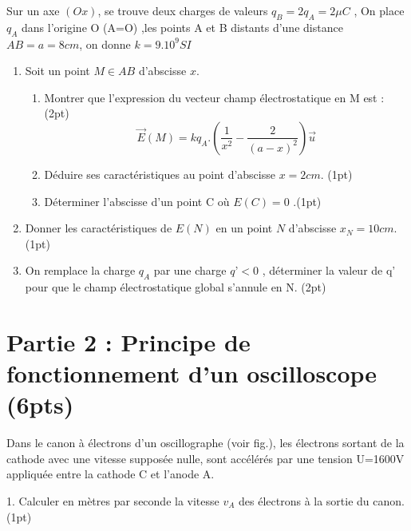 \documentclass[12pt]{article}
\begin{document}
Sur un axe $(Ox)$, se trouve deux charges de valeurs $q_B = 2q_A = 2\mu C$ , On place $q_A$ dans l'origine O (A=O) ,les points A et B
distants d’une distance $AB=a=8 cm$, on donne $k = 9.10^9SI$

\begin{enumerate}
    \item  Soit un point $M \in AB$ d’abscisse $x$.
      \begin{enumerate}
        \item Montrer que l’expression du vecteur champ électrostatique en M est :\dotfill(2pt) $$\vec{E}(M) = kq_A.(\frac{1}{x^2} - \frac{2}{(a-x)^2})\vec{u}$$
        \item Déduire ses caractéristiques au point d’abscisse $x=2 cm$. \dotfill(1pt)
        \item Déterminer l’abscisse d’un point C où $E(C)=0$ .\dotfill(1pt)
      \end{enumerate}
    \item Donner les caractéristiques de $E(N)$ en un point $N$ d’abscisse $x_N =10 cm$. \dotfill(1pt)
    \item On remplace la charge $q_A$ par une charge $q’<0$ , déterminer la valeur de q’ pour que le champ électrostatique global s’annule en N. \dotfill(2pt)
\end{enumerate}

 \section*{Partie 2 : Principe de fonctionnement d'un oscilloscope \dotfill(6pts)}
Dans le canon à électrons d’un oscillographe (voir fig.), les électrons sortant de la cathode avec une vitesse
supposée nulle, sont accélérés par une tension U=1600V appliquée entre la cathode C et l’anode A.

1. Calculer en mètres par seconde la vitesse $v_A$ des électrons à la sortie du canon.\dotfill(1pt)
   
\end{document}
